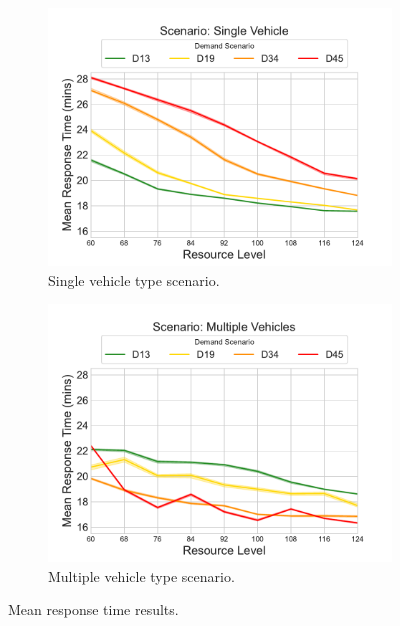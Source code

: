 \documentclass[preprint,12pt]{elsarticle}
\begin{document}
\begin{figure}
\begin{center}
\begin{subfigure}{0.43\textwidth}
\includegraphics[width=\textwidth]{img/results/single_MeanResponseTime}
\caption{Single vehicle type scenario.}
\label{fig:results_response_single}
\end{subfigure}
\begin{subfigure}{0.43\textwidth}
\includegraphics[width=\textwidth]{img/results/multiple_MeanResponseTime}
\caption{Multiple vehicle type scenario.}
\label{fig:results_response_multiple}
\end{subfigure}
\end{center}
\caption{Mean response time results.}
\end{figure}
\end{document}

